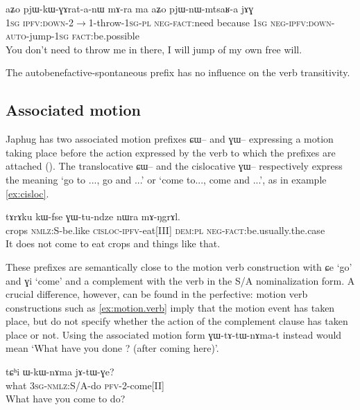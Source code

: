 \documentclass[oldfontcommands,oneside,a4paper,11pt]{article}
\newcommand{\ipa}[1]{{\phon #1}} %
\begin{document}
\begin{exe}
\ex \label{ex:pjWnWmtsaRa}
\gll 
\ipa{aʑo} 	\ipa{pjɯ-kɯ-ɣɤrat-a-nɯ} 	\ipa{mɤ-ra} 	\ipa{ma} 	\ipa{aʑo} 	\ipa{pjɯ-nɯ-mtsaʁ-a} 	\ipa{jɤɣ} \\
\textsc{1sg} \textsc{ipfv:down}-2$\rightarrow$1-throw-\textsc{1sg-pl} \textsc{neg-fact}:need because \textsc{1sg} \textsc{neg-ipfv:down-auto}-jump-\textsc{1sg} \textsc{fact}:be.possible \\
\glt You don't need to throw me in there, I will jump of my own free will.
\end{exe}

The autobenefactive-spontaneous prefix has no influence on the verb transitivity.

\subsection{Associated motion}
Japhug has two associated motion prefixes \ipa{ɕɯ--} and \ipa{ɣɯ--} expressing a motion taking place before the action expressed by the verb to which the prefixes are attached 
(\citealt{jacques13harmonization}). The translocative \ipa{ɕɯ--} and the cislocative \ipa{ɣɯ--} respectively express the meaning `go to ..., go and ...' or `come to..., come and ...', as in example \ref{ex:cisloc}.


\begin{exe}
\ex \label{ex:cisloc}
\gll
\ipa{tɤrɤku} 	\ipa{kɯ-fse} 	\ipa{ɣɯ-tu-ndze} 	\ipa{nɯra} 	\ipa{mɤ-ŋgrɤl.} \\
crops \textsc{nmlz}:S-be.like \textsc{cisloc-ipfv}-eat[III] \textsc{dem:pl} \textsc{neg-fact}:be.usually.the.case \\
\glt It does not come to eat crops and things like that.
\end{exe}

These prefixes are semantically close to the motion verb construction with \ipa{ɕe} `go' and \ipa{ɣi} `come' and a complement with the verb in the S/A nominalization form. A crucial difference, however, can be found in the perfective:  motion verb constructions such as \ref{ex:motion.verb} imply that the motion event has taken place, but do not specify whether the action of the complement clause has taken place or not. Using the associated motion form \ipa{ɣɯ-tɤ-tɯ-nɤma-t} instead would mean `What have you done ? (after coming here)'.

\begin{exe}
\ex \label{ex:motion.verb}
\gll
\ipa{tɕʰi} 	\ipa{ɯ-kɯ-nɤma} 	\ipa{jɤ-tɯ-ɣe?} \\
what \textsc{3sg-nmlz:}S/A-do \textsc{pfv-2}-come[II] \\
\glt What have you come to do?
\end{exe}
\end{document}
